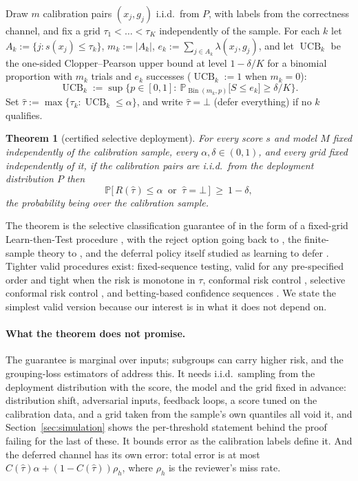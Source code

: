 \documentclass[11pt,letterpaper]{article}
\renewcommand{\Pr}{\mathbb{P}}
\DeclareMathOperator{\UCB}{UCB}
\DeclareMathOperator{\Bin}{Bin}
\newcommand{\tauhat}{\hat{\tau}}
\theoremstyle{plain}
\newtheorem{theorem}{Theorem}
\theoremstyle{definition}
\theoremstyle{remark}
\begin{document}
Draw $m$ calibration pairs $(x_j,g_j)$ i.i.d.\ from $P$, with labels from the correctness channel, and fix a grid $\tau_1<\dots<\tau_K$ independently of the sample. For each $k$ let $A_k:=\{j:s(x_j)\le\tau_k\}$, $m_k:=|A_k|$, $e_k:=\sum_{j\in A_k}\lambda(x_j,g_j)$, and let $\UCB_k$ be the one-sided Clopper--Pearson upper bound \citep{clopper1934} at level $1-\delta/K$ for a binomial proportion with $m_k$ trials and $e_k$ successes ($\UCB_k:=1$ when $m_k=0$):
\begin{equation}
\UCB_k:=\sup\Big\{p\in[0,1]:\ \Pr_{\Bin(m_k,p)}\big[S\le e_k\big]\ge\delta/K\Big\}.
\end{equation}
Set $\tauhat:=\max\{\tau_k:\UCB_k\le\alpha\}$, and write $\tauhat=\bot$ (defer everything) if no $k$ qualifies.

\begin{theorem}[certified selective deployment]
\label{thm:selective}
For every score $s$ and model $M$ fixed independently of the calibration sample, every $\alpha,\delta\in(0,1)$, and every grid fixed independently of it, if the calibration pairs are i.i.d.\ from the deployment distribution $P$ then
\begin{equation}
\Pr\big[\,R(\tauhat)\le\alpha\ \text{ or }\ \tauhat=\bot\,\big]\ \ge\ 1-\delta,
\end{equation}
the probability being over the calibration sample.
\end{theorem}

The theorem is the selective classification guarantee of \citet{geifman2017} in the form of a fixed-grid Learn-then-Test procedure \citep{angelopoulos2021ltt,bates2021rcps}, with the reject option going back to \citet{chow1957,chow1970}, the finite-sample theory to \citet{elyaniv2010,vovk2005}, and the deferral policy itself studied as learning to defer \citep{madras2018,mozannar2020}. Tighter valid procedures exist: fixed-sequence testing, valid for any pre-specified order and tight when the risk is monotone in $\tau$, conformal risk control \citep{angelopoulos2022crc}, selective conformal risk control \citep{xu2025scrc}, and betting-based confidence sequences \citep{basu2026}. We state the simplest valid version because our interest is in what it does not depend on.

\paragraph{What the theorem does not promise.} The guarantee is marginal over inputs; subgroups can carry higher risk, and the grouping-loss estimators of \citet{melo2026} address this. It needs i.i.d.\ sampling from the deployment distribution with the score, the model and the grid fixed in advance: distribution shift, adversarial inputs, feedback loops, a score tuned on the calibration data, and a grid taken from the sample's own quantiles all void it, and Section~\ref{sec:simulation} shows the per-threshold statement behind the proof failing for the last of these. It bounds error as the calibration labels define it. And the deferred channel has its own error: total error is at most $C(\tauhat)\alpha+(1-C(\tauhat))\rho_h$, where $\rho_h$ is the reviewer's miss rate.
\end{document}
